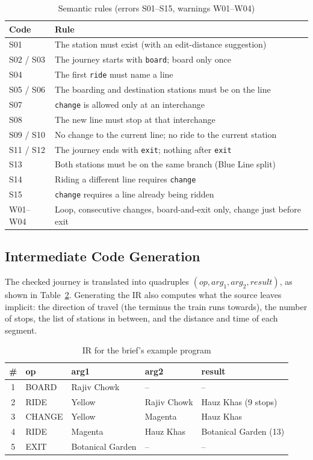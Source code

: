 \documentclass[conference]{IEEEtran}
\begin{document}
\begin{table}[t]
\caption{Semantic rules (errors S01--S15, warnings W01--W04)}\label{tab:rules}
\centering\footnotesize
\begin{tabular}{@{}l p{6.6cm}@{}}
\toprule
\textbf{Code} & \textbf{Rule}\\
\midrule
S01 & The station must exist (with an edit-distance suggestion)\\
S02 / S03 & The journey starts with \texttt{board}; board only once\\
S04 & The first \texttt{ride} must name a line\\
S05 / S06 & The boarding and destination stations must be on the line\\
S07 & \texttt{change} is allowed only at an interchange\\
S08 & The new line must stop at that interchange\\
S09 / S10 & No change to the current line; no ride to the current station\\
S11 / S12 & The journey ends with \texttt{exit}; nothing after \texttt{exit}\\
S13 & Both stations must be on the same branch (Blue Line split)\\
S14 & Riding a different line requires \texttt{change}\\
S15 & \texttt{change} requires a line already being ridden\\
\midrule
W01--W04 & Loop, consecutive changes, board-and-exit only, change just before exit\\
\bottomrule
\end{tabular}
\end{table}

\subsection{Intermediate Code Generation}
The checked journey is translated into quadruples $(\mathit{op}, \mathit{arg}_1, \mathit{arg}_2, \mathit{result})$, as shown in Table~\ref{tab:ir}. Generating the IR also computes what the source leaves implicit: the direction of travel (the terminus the train runs towards), the number of stops, the list of stations in between, and the distance and time of each segment.

\begin{table}[t]
\caption{IR for the brief's example program}\label{tab:ir}
\centering\footnotesize
\begin{tabular}{@{}c l l l l@{}}
\toprule
\# & \textbf{op} & \textbf{arg1} & \textbf{arg2} & \textbf{result}\\
\midrule
1 & BOARD & Rajiv Chowk & -- & --\\
2 & RIDE & Yellow & Rajiv Chowk & Hauz Khas \hfill(9 stops)\\
3 & CHANGE & Yellow & Magenta & Hauz Khas\\
4 & RIDE & Magenta & Hauz Khas & Botanical Garden \hfill(13)\\
5 & EXIT & Botanical Garden & -- & --\\
\bottomrule
\end{tabular}
\end{table}
\end{document}
